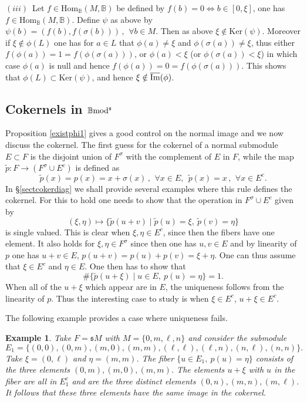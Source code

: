 \documentclass[12pt]{article}
\newtheorem{example}[thm]{Example}
\def\Hom{{\rm Hom}}
\def\B{{\mathbb B}}
\def\imm{\overline{\rm Im}}
\def\qqq{\,,\,~\forall}
\def\ker{{\mbox{Ker}}}
\def\Hom {{\mbox{Hom}}}
\def\yb{\mathfrak{s}}
\def\b2{{\rm \B mod^{\mathfrak s}}}
\begin{document}
 $(iii)$~Let $f\in \Hom_\B(M,\B)$ be defined by  $f(b)=0\iff b\in [0,\xi]$, one has $f\in \Hom_\B(M,\B)$. Define $\psi$ as above  by 
$
\psi(b)=(f(b),f(\sigma(b)))\qqq b\in M
$. Then as above $\xi\notin \ker(\psi)$. Moreover  if $\xi\notin \phi(L)$ one has for $a\in L$ that $\phi(a)\neq \xi$ and $\phi(\sigma(a))\neq \xi$, thus  either $f(\phi(a))=1=f(\phi(\sigma(a)))$, or $\phi(a)<\xi$ (or $\phi(\sigma(a))<\xi$) in which case $\phi(a)$ is null and hence $f(\phi(a))=0=f(\phi(\sigma(a)))$. This shows that $\phi(L)\subset \ker(\psi)$, and hence $\xi\notin \imm(\phi)$. 
  \endproof 
  
  \subsection{Cokernels  in $\b2$}\label{sectcokerb2}


Proposition \ref{existphi1} gives a good control on the normal image and we now discuss the cokernel. The first guess for the cokernel of a normal submodule $E\subset F$ is the disjoint union of $F^\sigma$ with the complement of $E$ in $F$, while the map $\tilde p:F\to (F^\sigma\cup E^c)$ is defined as 
$$
\tilde p(x)=p(x)=x+\sigma(x)\qqq x\in E, \  \ \tilde p(x)=x\qqq x\in E^c.
$$
 In \S\ref{sectcokerdiag} we shall provide several examples where 
  this rule defines the cokernel. For this to hold one needs to show that the operation in $F^\sigma\cup E^c$ given by
  \begin{equation}\label{operation single0}
(\xi,\eta)\mapsto \{\tilde p(u+v)\mid \tilde p (u)=\xi,\ \tilde p(v)=\eta\}
\end{equation}
is single valued. This is clear when $\xi,\eta\in E^c$, since then the fibers have one element. It also holds for $\xi,\eta\in F^\sigma$ since then one has $u,v\in E$ and by linearity of $p$ one has $u+v\in E$, $p(u+v)=p(u)+p(v)=\xi+\eta$. One can thus assume that $\xi \in E^c$ and $\eta\in E$.  One then has to show that 
\begin{equation}\label{single0} 
	\#\{\tilde p(u+\xi)\mid u\in E, \ p(u)=\eta\}=1.
\end{equation}
  When all of the $u+\xi$ which appear are in $E$, the uniqueness follows from the linearity of $p$. Thus the interesting case to study is when $\xi \in E^c$, $u+\xi \in E^c$. \vspace{.05in}
  
  The following example provides a case where uniqueness fails.
  
  \begin{example}  \label{example coker}	
  Take $F=\yb M$ with $M=\{0,m,\ell,n\}$ and consider the submodule
  $$
  E_1=\{(0, 0), (0, m), (m, 0), (m, m), (\ell, \ell), (\ell, n), (n, \ell), (n, n)\}.
  $$
  Take $\xi=(0,\ell)$ and $\eta=(m,m)$. The fiber $\{u\in E_1, \ p(u)=\eta\}$ consists of the three elements $(0, m), (m, 0), (m, m)$. The elements $u+\xi$ with $u$ in the fiber are all in $E^c_1$ and are the three distinct elements $(0,n),(m,n),(m,\ell)$. It follows that these three elements have the same image in the cokernel.
   \end{example}
      
\end{document}
